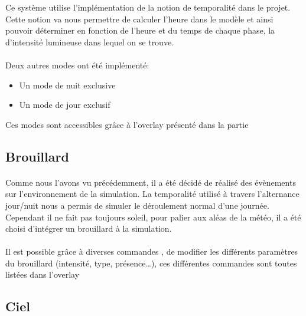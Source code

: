 Ce système utilise l'implémentation de la notion de temporalité dans le projet.
Cette notion va nous permettre de calculer l'heure dans le modèle et ainsi
pouvoir déterminer en fonction de l'heure et du temps de chaque phase, la
d'intensité lumineuse dans lequel on se trouve.

\paragraph{}


\paragraph{}

Deux autres modes ont été implémenté:\\
\begin{itemize}
  \item Un mode de nuit exclusive
  \item Un mode de jour exclusif\\
\end{itemize}

Ces modes sont accessibles grâce à l'overlay présenté dans la partie %

\subsection{Brouillard}

\paragraph{}
Comme nous l'avons vu précédemment, il a été décidé de réalisé des évènements
sur l'environnement de la simulation. La temporalité utilisé à travers
l'alternance jour/nuit nous a permis de simuler le déroulement normal d'une
journée. Cependant il ne fait pas toujours soleil, pour palier aux aléas de la
météo, il a été choisi d'intégrer un brouillard à la simulation.

\paragraph{}
Il est possible grâce à diverses commandes , de modifier les différents
paramètres du brouillard (intensité, type, présence\ldots), ces différentes
commandes sont toutes listées dans l'overlay 


\subsection{Ciel}
